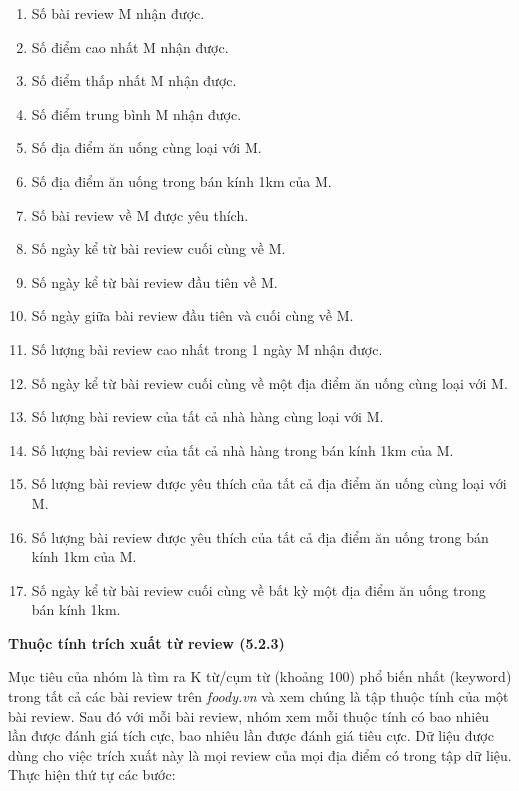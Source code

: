 \documentclass[12pt]{extarticle}
\begin{document}
				\begin{enumerate}
					\item Số bài review M nhận được.
					\item Số điểm cao nhất M nhận được.
					\item Số điểm thấp nhất M nhận được.
					\item Số điểm trung bình M nhận được.
					\item Số địa điểm ăn uống cùng loại với M.
					\item Số địa điểm ăn uống trong bán kính 1km của M.
					\item Số bài review về M được yêu thích.
					\item Số ngày kể từ bài review cuối cùng về M. 
					\item Số ngày kể từ bài review đầu tiên về M.
					\item Số ngày giữa bài review đầu tiên và cuối cùng về M. 
					\item Số lượng bài review cao nhất trong 1 ngày M nhận được.
					\item Số ngày kể từ bài review cuối cùng về một địa điểm ăn uống cùng loại với M.
					\item Số lượng bài review của tất cả nhà hàng cùng loại với M.
					\item Số lượng bài review của tất cả nhà hàng trong bán kính 1km của M.	
					\item Số lượng bài review được yêu thích của tất cả địa điểm ăn uống cùng loại với M.
					\item Số lượng bài review được yêu thích của tất cả địa điểm ăn uống trong bán kính 1km của M.
					\item Số ngày kể từ bài review cuối cùng về bất kỳ một địa điểm ăn uống trong bán kính 1km.
				\end{enumerate}
			\par \textbf{Thuộc tính trích xuất từ review (5.2.3)}
				\par Mục tiêu của nhóm là tìm ra K từ/cụm từ (khoảng 100) phổ biến nhất (keyword) trong tất cả các bài review trên \textit{foody.vn} và  xem chúng là tập thuộc tính của một bài review. Sau đó với mỗi bài review, nhóm xem mỗi thuộc tính có bao nhiêu lần được đánh giá tích cực, bao nhiêu lần được đánh giá tiêu cực. Dữ liệu được dùng cho việc trích xuất này là mọi review của mọi địa điểm có trong tập dữ liệu. Thực hiện thứ tự các bước:
\end{document}
